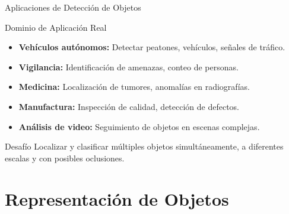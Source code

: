 \documentclass[aspectratio=169, 10pt]{beamer}
\begin{document}
\begin{frame}{Aplicaciones de Detecci\'on de Objetos}

	\begin{block}{Dominio de Aplicaci\'on Real}
		\begin{itemize}
			\item \textbf{Veh\'iculos aut\'onomos:} Detectar peatones, veh\'iculos, se\~nales de tr\'afico.
			\item \textbf{Vigilancia:} Identificaci\'on de amenazas, conteo de personas.
			\item \textbf{Medicina:} Localizaci\'on de tumores, anomal\'ias en radiograf\'ias.
			\item \textbf{Manufactura:} Inspecci\'on de calidad, detecci\'on de defectos.
			\item \textbf{An\'alisis de video:} Seguimiento de objetos en escenas complejas.
		\end{itemize}
	\end{block}

	\vspace{0.3cm}

	\begin{alertblock}{Desaf\'io}
		Localizar y clasificar m\'ultiples objetos simult\'aneamente, a diferentes escalas y con posibles oclusiones.
	\end{alertblock}

\end{frame}

\section{Representaci\'on de Objetos}
\end{document}
